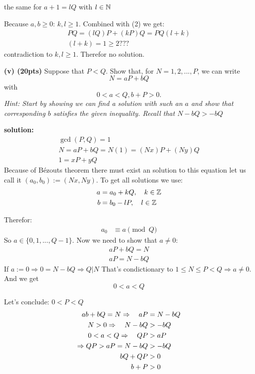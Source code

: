 \documentclass{article}
\begin{document}
the same for $a+1 = lQ$ with $l \in \mathbb{N}$

Because $a,b \geq 0$: $k,l \geq 1$. 
Combined with (2) we get:
\begin{align*}
    PQ = (lQ)P + (kP)Q = PQ(l+k) \\
    (l + k) = 1 \geq 2 ???
\end{align*}
contradiction to $k,l \geq 1$. Therefor no solution.

\textbf{(v) (20pts)}
Suppose that $P<Q$. Show that, for $N = 1, 2, ... , P$, we can write
\[
N = aP + bQ
\]
with 
\[
0 < a < Q, b+P > 0.
\]
\textit{
Hint: Start by showing we can find a solution with such an $a$
and show that corresponding $b$ satisfies the given inequality. 
Recall that $N-bQ > -bQ$
}

\textbf{solution:}
\begin{align*}
    \gcd(P, Q) = 1 \\
    N = aP + bQ = 
    N(1) = (N x)P + (N y)Q \\
    1 = xP + yQ
\end{align*}
Because of Bézouts theorem there must exist an solution to this equation
let us call it $(a_{0},b_{0}) := (Nx, Ny)$.
To get all solutions we use:
\begin{align*}
    a &= a_{0} + kQ, \hspace{10pt} k \in \mathbb{Z} \\
    b &= b_{0} - lP, \hspace{10pt} l \in \mathbb{Z}
\end{align*}

Therefor:
\begin{align*}
    a_{0} &\equiv a \pmod{Q}
\end{align*}
So $a \in \{0,1,...,Q-1\}$. Now we need to show that $a \neq 0$: 
\begin{align*}
    aP + bQ = N \\
    aP = N - bQ
\end{align*}
If $a := 0 \Rightarrow 0 = N-bQ \Rightarrow Q | N$
That's condictionary to $1 \leq N \leq P < Q \Rightarrow a \neq 0$. 
And we get \[0<a<Q\]

Let's conclude: $0 < P < Q$
\begin{align*}
    ab + bQ = N \Rightarrow \hspace{10pt} aP &= N-bQ \\
    N > 0 \Rightarrow \hspace{10pt} N - bQ &> -bQ \\
    0<a<Q \Rightarrow \hspace{10pt} QP &> aP \\
    \Rightarrow
    QP > aP = N-bQ &> -bQ \\
    bQ + QP &> 0 \\
    b + P &> 0
\end{align*}
\end{document}

